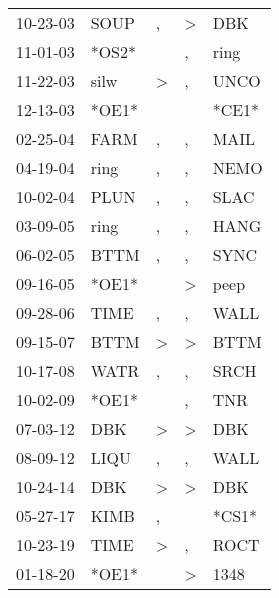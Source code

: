 \begin{supertabular}{lllll}
 10-23-03 &   SOUP &             , &  \textgreater &    DBK \\
 11-01-03 &  *OS2* &               &             , &   ring \\
 11-22-03 &   silw &  \textgreater &             , &   UNCO \\
 12-13-03 &  *OE1* &               &               &  *CE1* \\
 02-25-04 &   FARM &             , &             , &   MAIL \\
 04-19-04 &   ring &             , &             , &   NEMO \\
 10-02-04 &   PLUN &             , &             , &   SLAC \\
 03-09-05 &   ring &             , &             , &   HANG \\
 06-02-05 &   BTTM &             , &             , &   SYNC \\
 09-16-05 &  *OE1* &               &  \textgreater &   peep \\
 09-28-06 &   TIME &             , &             , &   WALL \\
 09-15-07 &   BTTM &  \textgreater &  \textgreater &   BTTM \\
 10-17-08 &   WATR &             , &             , &   SRCH \\
 10-02-09 &  *OE1* &               &             , &    TNR \\
 07-03-12 &    DBK &  \textgreater &  \textgreater &    DBK \\
 08-09-12 &   LIQU &             , &             , &   WALL \\
 10-24-14 &    DBK &  \textgreater &  \textgreater &    DBK \\
 05-27-17 &   KIMB &             , &               &  *CS1* \\
 10-23-19 &   TIME &  \textgreater &             , &   ROCT \\
 01-18-20 &  *OE1* &               &  \textgreater &   1348 \\
\end{supertabular}

